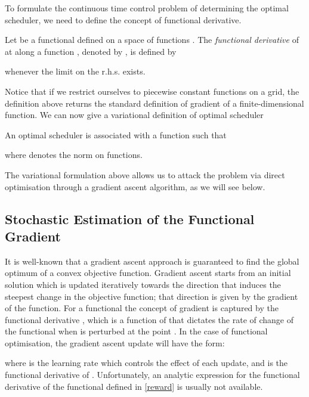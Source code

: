To formulate the continuous time control problem of determining the optimal scheduler, we need to define the concept of functional derivative.

\begin{definition}
Let  be a functional defined on a space of functions . 
The {\it functional derivative} of  at  along a function , denoted by , is defined by 

whenever the limit on the r.h.s. exists.  \end{definition}
Notice that if we restrict ourselves to piecewise constant functions on a grid, the definition above returns the standard definition of gradient of a finite-dimensional function.
We can now give a variational definition of optimal scheduler
\begin{lemma}
An optimal scheduler  is associated with a function  such that 

where  denotes the  norm on functions.
\end{lemma}
The variational formulation above allows us to attack the problem via direct optimisation through a gradient ascent algorithm, as we will see below.





















\subsection{Stochastic Estimation of the Functional Gradient}

It is well-known that a gradient ascent approach is guaranteed to find the global optimum of a convex objective function.
Gradient ascent starts from an initial solution which is updated iteratively towards the direction that induces the steepest change in the objective function; that direction is given by the gradient of the function.
For a functional  the concept of gradient is captured by the functional derivative , which is a function of  that dictates the rate of change of the functional  when  is perturbed at the point .
In the case of functional optimisation, the gradient ascent update will have the form:

where  is the learning rate which controls the effect of each update, and  is the functional derivative of . Unfortunately, an analytic expression for the functional derivative of the functional defined in \eqref{reward} is usually not available.

